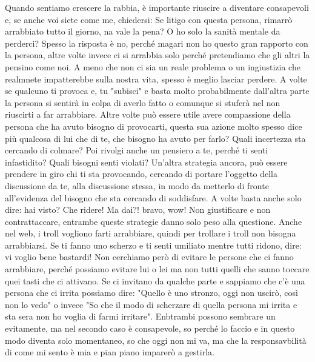 \documentclass[12pt]{book} %
\begin{document}
Quando sentiamo crescere la rabbia, è importante riuscire a diventare consapevoli e, se anche voi siete come me, chiedersi:
Se litigo con questa persona, rimarrò arrabbiato tutto il giorno, na vale la pena? O ho solo la sanità mentale da perderci?
Spesso la risposta è no, perché magari non ho questo gran rapporto con la persona, altre volte invece ci si arrabbia solo perché pretendiamo che gli altri la pensino come noi. A meno che non ci sia un reale problema o un ingiustizia che realmnete impatterebbe sulla nostra vita, spesso è meglio lasciar perdere. 
A volte se qualcuno ti provoca e, tu "subisci" e basta molto probabilmente dall'altra parte la persona si sentirà in colpa di averlo fatto o comunque si stuferà nel non riuscirti a far arrabbiare. Altre volte può essere utile avere compassione della persona che ha avuto bisogno di provocarti, questa sua azione molto spesso dice più qualcosa di lui che di te, che bisogno ha avuto per farlo? Quali incertezza sta cercando di colmare? Poi rivolgi anche un pensiero a te, perché ti senti infastidito? Quali bisogni senti violati?
Un'altra strategia ancora, può essere prendere in giro chi ti sta provocando, cercando di portare l'oggetto della discussione da te, alla discussione stessa, in modo da metterlo di fronte all'evidenza del bisogno che sta cercando di soddisfare. A volte basta anche solo dire: \newline
hai visto? Che ridere! \newline
Ma dai?! bravo, wow! \newline
Non giustificare e non contrattaccare, entrambe queste strategie danno solo peso alla questione.
Anche nel web, i troll vogliono farti arrabbiare, quindi per trollare i troll non bisogna arrabbiarsi.
Se ti fanno uno scherzo e ti senti umiliato mentre tutti ridono, dire: vi voglio bene bastardi!
Non cerchiamo però di evitare le persone che ci fanno arrabbiare, perché possiamo evitare lui o lei ma non tutti quelli che sanno toccare quei tasti che ci attivano. Se ci invitano da qualche parte e sappiamo che c'è una persona che ci irrita possiamo dire: "Quello è uno stronzo, oggi non uscirò, così non lo vedo" o invece "So che il modo di scherzare di quella persona mi irrita e sta sera non ho voglia di farmi irritare". Enbtrambi possono sembrare un evitamente, ma nel secondo caso è consapevole, so perché lo faccio e in questo modo diventa solo momentaneo, so che oggi non mi va, ma che la responsavbilità di come mi sento è mia e pian piano imparerò a gestirla.
\end{document}
